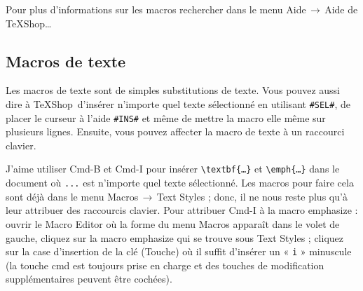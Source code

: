 \documentclass[11pt,french]{article}
\newcommand{\TS}{\textsf{\TeX Shop}}
\newcommand{\cmd}[1]{\textsf{#1}}
\newcommand{\mnu}[1]{\textsf{#1}}
\newcommand{\To}{\,\(\to\)\,}
\begin{document}
Pour plus d'informations sur les \cmd{macros} rechercher dans le menu \mnu{Aide}\To\mnu{Aide de TeXShop…}


\subsection{Macros de texte}

Les macros de texte sont de simples substitutions de texte. Vous pouvez aussi dire à \TS\ d'insérer n'importe quel texte sélectionné en utilisant \verb|#SEL#|, de placer le curseur à l'aide \verb|#INS#| et même de mettre la macro elle même sur plusieurs lignes. Ensuite, vous pouvez affecter la macro de texte à un raccourci clavier.

J'aime utiliser \cmd{Cmd-B} et \cmd{Cmd-I} pour insérer \verb|\textbf{…}| et \verb|\emph{…}| dans le document où \texttt {...} est n'importe quel texte sélectionné. Les macros pour faire cela sont déjà dans le menu \mnu{Macros}\To\mnu{Text Styles} ; donc, il ne nous reste plus qu'à leur attribuer des raccourcis clavier. Pour attribuer \cmd{Cmd-I} à la macro \mnu{emphasize} : ouvrir le \mnu{Macro Editor} où la forme du menu \mnu{Macros} apparaît dans le volet de gauche, cliquez sur la macro \mnu{emphasize} qui se trouve sous \mnu{Text Styles} ; cliquez sur la case d'insertion de la clé (\mnu{Touche}) où il suffit d'insérer un « \texttt{i} » minuscule (la touche \cmd{cmd} est toujours prise en charge et des touches de modification supplémentaires peuvent être cochées).

%
\end{document}
